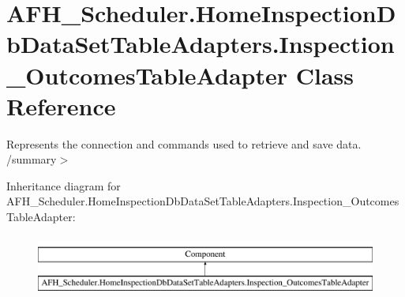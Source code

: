 \section{A\+F\+H\+\_\+\+Scheduler.\+Home\+Inspection\+Db\+Data\+Set\+Table\+Adapters.\+Inspection\+\_\+\+Outcomes\+Table\+Adapter Class Reference}
\label{class_a_f_h___scheduler_1_1_home_inspection_db_data_set_table_adapters_1_1_inspection___outcomes_table_adapter}


Represents the connection and commands used to retrieve and save data. /summary$>$  


Inheritance diagram for A\+F\+H\+\_\+\+Scheduler.\+Home\+Inspection\+Db\+Data\+Set\+Table\+Adapters.\+Inspection\+\_\+\+Outcomes\+Table\+Adapter\+:\begin{figure}[H]
\begin{center}
\leavevmode
\includegraphics[height=2.000000cm]{class_a_f_h___scheduler_1_1_home_inspection_db_data_set_table_adapters_1_1_inspection___outcomes_table_adapter}
\end{center}
\end{figure}
